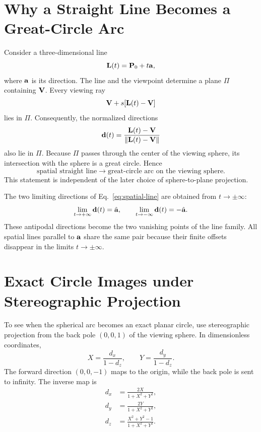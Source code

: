 \section{Why a Straight Line Becomes a Great-Circle Arc}
Consider a three-dimensional line
\begin{equation}
  \vb L(t)=\vb P_0+t\vb a,
  \label{eq:spatial-line}
\end{equation}
where $\vb a$ is its direction.  The line and the viewpoint determine a plane $\Pi$ containing $\vb V$.  Every viewing ray
\begin{equation}
  \vb V+s[\vb L(t)-\vb V]
\end{equation}
lies in $\Pi$.  Consequently, the normalized directions
\begin{equation}
  \vb d(t)=
  \frac{\vb L(t)-\vb V}
       {\lVert\vb L(t)-\vb V\rVert}
  \label{eq:line-directions}
\end{equation}
also lie in $\Pi$.  Because $\Pi$ passes through the center of the viewing sphere, its intersection with the sphere is a great circle.  Hence
\begin{equation}
  \text{spatial straight line}
  \longrightarrow
  \text{great-circle arc on the viewing sphere}.
  \label{eq:line-to-great-circle}
\end{equation}
This statement is independent of the later choice of sphere-to-plane projection.

The two limiting directions of Eq.~\eqref{eq:spatial-line} are obtained from $t\to\pm\infty$:
\begin{equation}
  \lim_{t\to+\infty}\vb d(t)=\hat{\vb a},
  \qquad
  \lim_{t\to-\infty}\vb d(t)=-\hat{\vb a}.
  \label{eq:line-limits}
\end{equation}
These antipodal directions become the two vanishing points of the line family.  All spatial lines parallel to $\vb a$ share the same pair because their finite offsets disappear in the limits $t\to\pm\infty$.

\section{Exact Circle Images under Stereographic Projection}
To see when the spherical arc becomes an exact planar circle, use stereographic projection from the back pole $(0,0,1)$ of the viewing sphere.  In dimensionless coordinates,
\begin{equation}
  X=\frac{d_x}{1-d_z},
  \qquad
  Y=\frac{d_y}{1-d_z}.
  \label{eq:stereographic}
\end{equation}
The forward direction $(0,0,-1)$ maps to the origin, while the back pole is sent to infinity.  The inverse map is
\begin{align}
  d_x&=\frac{2X}{1+X^2+Y^2},\\
  d_y&=\frac{2Y}{1+X^2+Y^2},\\
  d_z&=\frac{X^2+Y^2-1}{1+X^2+Y^2}.
  \label{eq:inverse-stereographic}
\end{align}

